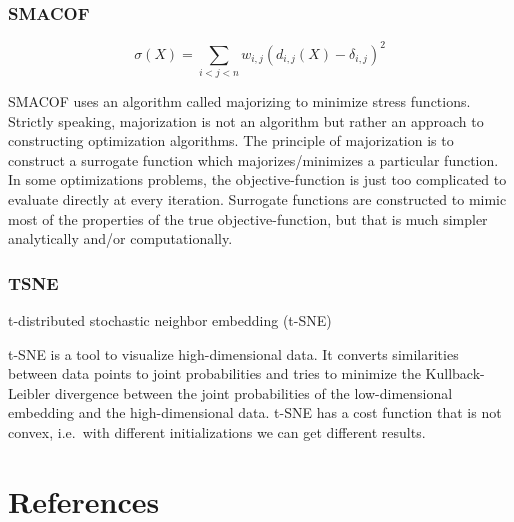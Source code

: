 \documentclass[11pt]{article}
\begin{document}
\hypertarget{smacof}{%
\subsubsection{SMACOF}\label{smacof}}

\[ \sigma(X) = \sum_{i<j<n} w_{i,j} (d_{i,j}(X)-\delta_{i,j})^2 \]

SMACOF uses an algorithm called majorizing to minimize stress functions.
Strictly speaking, majorization is not an algorithm but rather an
approach to constructing optimization algorithms. The principle of
majorization is to construct a surrogate function which
majorizes/minimizes a particular function. In some optimizations
problems, the objective-function is just too complicated to evaluate
directly at every iteration. Surrogate functions are constructed to
mimic most of the properties of the true objective-function, but that is
much simpler analytically and/or computationally.

\hypertarget{tsne}{%
\subsubsection{TSNE}\label{tsne}}

t-distributed stochastic neighbor embedding (t-SNE)

t-SNE is a tool to visualize high-dimensional data. It converts
similarities between data points to joint probabilities and tries to
minimize the Kullback-Leibler divergence between the joint probabilities
of the low-dimensional embedding and the high-dimensional data. t-SNE
has a cost function that is not convex, i.e.~with different
initializations we can get different results.

\newpage

\hypertarget{references}{%
\section{References}\label{references}}


    
    
    
    
\end{document}
